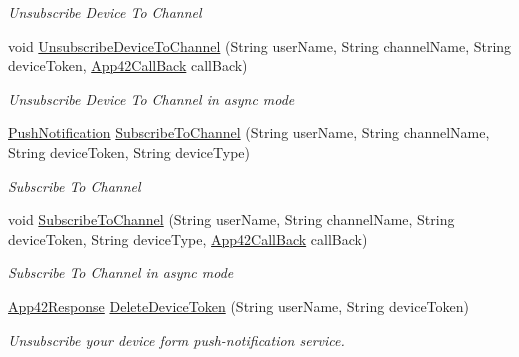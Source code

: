 \begin{DoxyCompactItemize}
\begin{DoxyCompactList}\small\item\em Unsubscribe Device To Channel \end{DoxyCompactList}\item 
void \hyperlink{classcom_1_1shephertz_1_1app42_1_1paas_1_1sdk_1_1csharp_1_1push_notification_1_1_push_notification_service_a5c171adf825185879e1d7ddef7867fe8}{Unsubscribe\+Device\+To\+Channel} (String user\+Name, String channel\+Name, String device\+Token, \hyperlink{interfacecom_1_1shephertz_1_1app42_1_1paas_1_1sdk_1_1csharp_1_1_app42_call_back}{App42\+Call\+Back} call\+Back)
\begin{DoxyCompactList}\small\item\em Unsubscribe Device To Channel in async mode \end{DoxyCompactList}\item 
\hyperlink{classcom_1_1shephertz_1_1app42_1_1paas_1_1sdk_1_1csharp_1_1push_notification_1_1_push_notification}{Push\+Notification} \hyperlink{classcom_1_1shephertz_1_1app42_1_1paas_1_1sdk_1_1csharp_1_1push_notification_1_1_push_notification_service_a94a2f09f7e043b80401f41fc564cb097}{Subscribe\+To\+Channel} (String user\+Name, String channel\+Name, String device\+Token, String device\+Type)
\begin{DoxyCompactList}\small\item\em Subscribe To Channel \end{DoxyCompactList}\item 
void \hyperlink{classcom_1_1shephertz_1_1app42_1_1paas_1_1sdk_1_1csharp_1_1push_notification_1_1_push_notification_service_a4f6c02bbb620177b7418571ce2f5305f}{Subscribe\+To\+Channel} (String user\+Name, String channel\+Name, String device\+Token, String device\+Type, \hyperlink{interfacecom_1_1shephertz_1_1app42_1_1paas_1_1sdk_1_1csharp_1_1_app42_call_back}{App42\+Call\+Back} call\+Back)
\begin{DoxyCompactList}\small\item\em Subscribe To Channel in async mode \end{DoxyCompactList}\item 
\hyperlink{classcom_1_1shephertz_1_1app42_1_1paas_1_1sdk_1_1csharp_1_1_app42_response}{App42\+Response} \hyperlink{classcom_1_1shephertz_1_1app42_1_1paas_1_1sdk_1_1csharp_1_1push_notification_1_1_push_notification_service_ad471149d818d99bb0eca9b550edfbcec}{Delete\+Device\+Token} (String user\+Name, String device\+Token)
\begin{DoxyCompactList}\small\item\em Unsubscribe your device form push-\/notification service. \end{DoxyCompactList}\item 

\end{DoxyCompactItemize}

